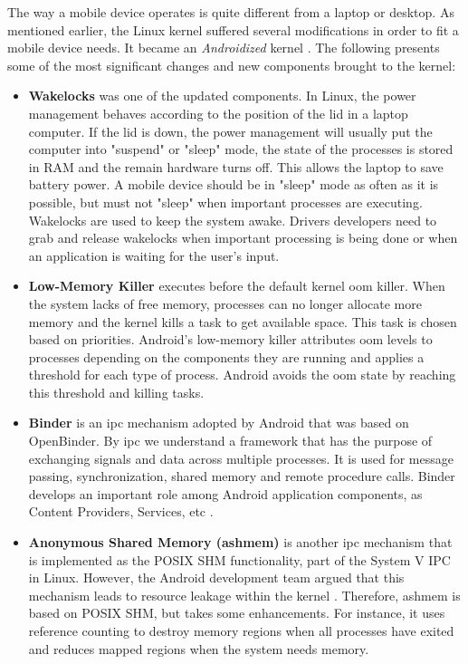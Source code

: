 The way a mobile device operates is quite different from a laptop or desktop. As mentioned earlier, the Linux kernel suffered several modifications in order to fit a mobile device needs. It became an \textit{Androidized} kernel \cite{EmbeddedAndroid}. The following presents some of the most significant changes and new components brought to the kernel:

\begin{itemize}
 \item \textbf{Wakelocks} was one of the updated components. In Linux, the power management behaves according to the position of the lid in a laptop computer. If the lid is down, the power management will usually put the computer into "suspend" or "sleep" mode, the state of the processes is stored in RAM and the remain hardware turns off. This allows the laptop to save battery power. A mobile device should be in "sleep" mode as often as it is possible, but must not "sleep" when important processes are executing. Wakelocks are used to keep the system awake. Drivers developers need to grab and release wakelocks when important processing is being done or when an application is waiting for the user's input.

 \item \textbf{Low-Memory Killer} executes before the default kernel \gls{oom} killer. When the system lacks of free memory, processes can no longer allocate more memory and the kernel kills a task to get available space. This task is chosen based on priorities. Android's low-memory killer attributes \gls{oom} levels to processes depending on the components they are running and applies a threshold for each type of process. Android avoids the \gls{oom} state by reaching this threshold and killing tasks.

\item \textbf{Binder} is an \gls{ipc} mechanism adopted by Android that was based on OpenBinder. By \gls{ipc} we understand a framework that has the purpose of exchanging signals and data across multiple processes. It is used for message passing, synchronization, shared memory and remote procedure calls. Binder develops an important role among Android application components, as Content Providers, Services, etc \cite{Binder2013}.

\item \textbf{Anonymous Shared Memory (ashmem)} is another \gls{ipc} mechanism that is implemented as the POSIX SHM functionality, part of the System V IPC in Linux. However, the Android development team argued that this mechanism leads to resource leakage within the kernel \cite{EmbeddedAndroid}. Therefore, ashmem is based on POSIX SHM, but takes some enhancements. For instance, it uses reference counting to destroy memory regions when all processes have exited and reduces mapped regions when the system needs memory.


\end{itemize}
